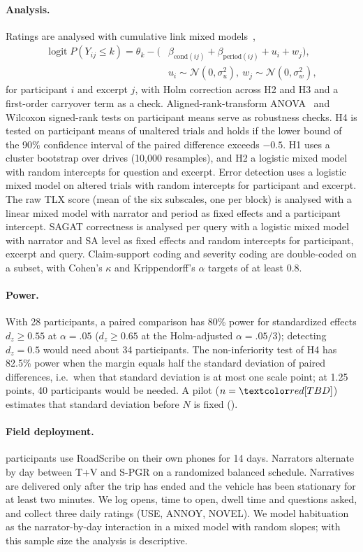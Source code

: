 \paragraph{Analysis.}
Ratings are analysed with cumulative link mixed models~\cite{christensen_ordinal},
\begin{equation}
\begin{aligned}
\operatorname{logit}P(Y_{ij}\le k)=\theta_k-\bigl(&\beta_{\mathrm{cond}(ij)}+\beta_{\mathrm{period}(ij)}+u_i+w_j\bigr),\\
&u_i\sim\mathcal N(0,\sigma_u^2),\ w_j\sim\mathcal N(0,\sigma_w^2),
\end{aligned}
\end{equation}
for participant $i$ and excerpt $j$, with Holm correction across H2 and H3 and a first-order carryover term as a check.
Aligned-rank-transform ANOVA~\cite{wobbrock2011art} and Wilcoxon signed-rank tests on participant means serve as robustness checks.
H4 is tested on participant means of unaltered trials and holds if the lower bound of the 90\% confidence interval of the paired difference exceeds $-0.5$.
H1 uses a cluster bootstrap over drives (10{,}000 resamples), and H2 a logistic mixed model with random intercepts for question and excerpt.
Error detection uses a logistic mixed model on altered trials with random intercepts for participant and excerpt.
The raw TLX score (mean of the six subscales, one per block) is analysed with a linear mixed model with narrator and period as fixed effects and a participant intercept.
SAGAT correctness is analysed per query with a logistic mixed model with narrator and SA level as fixed effects and random intercepts for participant, excerpt and query.
Claim-support coding and severity coding are double-coded on a subset, with Cohen's $\kappa$ and Krippendorff's $\alpha$ targets of at least 0.8.

\paragraph{Power.}
With 28 participants, a paired comparison has 80\% power for standardized effects $d_z\ge0.55$ at $\alpha=.05$ ($d_z\ge0.65$ at the Holm-adjusted $\alpha=.05/3$); detecting $d_z=0.5$ would need about 34 participants.
The non-inferiority test of H4 has 82.5\% power when the margin equals half the standard deviation of paired differences, i.e.\ when that standard deviation is at most one scale point; at 1.25 points, 40 participants would be needed.
A pilot ($n=\TBD{}$) estimates that standard deviation before $N$ is fixed (\TBD{}).

\paragraph{Field deployment.}
\TBD{} participants use RoadScribe on their own phones for 14 days.
Narrators alternate by day between T+V and S-PGR on a randomized balanced schedule.
Narratives are delivered only after the trip has ended and the vehicle has been stationary for at least two minutes.
We log opens, time to open, dwell time and questions asked, and collect three daily ratings (USE, ANNOY, NOVEL).
We model habituation as the narrator-by-day interaction in a mixed model with random slopes; with this sample size the analysis is descriptive.
